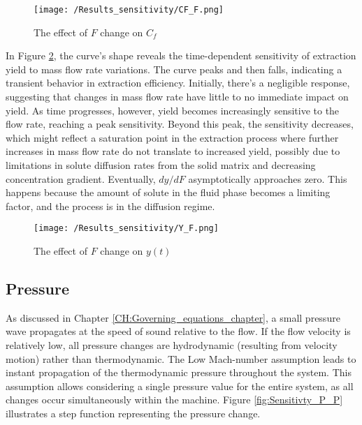 \documentclass[../Article_Sensitivity_Analsysis.tex]{subfiles}
\begin{document}
    \begin{figure}[h!]
    	\centering
    	\texttt{[image: /Results\_sensitivity/CF\_F.png]}
    	\caption{The effect of $F$ change on $C_f$}
    	\label{fig:Sensitivty_F_CF}
    \end{figure}

    In Figure \ref{fig:Sensitivty_F_y}, the curve's shape reveals the time-dependent sensitivity of extraction yield to mass flow rate variations. The curve peaks and then falls, indicating a transient behavior in extraction efficiency. Initially, there's a negligible response, suggesting that changes in mass flow rate have little to no immediate impact on yield. As time progresses, however, yield becomes increasingly sensitive to the flow rate, reaching a peak sensitivity. Beyond this peak, the sensitivity decreases, which might reflect a saturation point in the extraction process where further increases in mass flow rate do not translate to increased yield, possibly due to limitations in solute diffusion rates from the solid matrix and decreasing concentration gradient. Eventually, $dy/dF$ asymptotically approaches zero. This happens because the amount of solute in the fluid phase becomes a limiting factor, and the process is in the diffusion regime.
    
    \begin{figure}[h!]
    	\centering
    	\texttt{[image: /Results\_sensitivity/Y\_F.png]}
    	\caption{The effect of $F$ change on $y(t)$}
    	\label{fig:Sensitivty_F_y}
    \end{figure}
    
    \subsection{Pressure}
    
    As discussed in Chapter \ref{CH:Governing_equations_chapter}, a small pressure wave propagates at the speed of sound relative to the flow. If the flow velocity is relatively low, all pressure changes are hydrodynamic (resulting from velocity motion) rather than thermodynamic. The Low Mach-number assumption leads to instant propagation of the thermodynamic pressure throughout the system. This assumption allows considering a single pressure value for the entire system, as all changes occur simultaneously within the machine. Figure \ref{fig:Sensitivty_P_P} illustrates a step function representing the pressure change.
    
\end{document}
